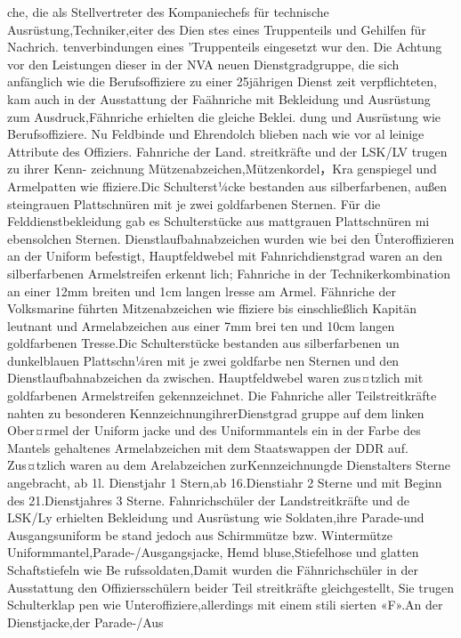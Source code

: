 che, die als Stellvertreter des Kompaniechefs für
technische Ausrüstung,Techniker,eiter des Dien
stes eines Truppenteils und Gehilfen für Nachrich.
tenverbindungen eines 'Truppenteils eingesetzt wur
den.
Die Achtung vor den Leistungen dieser in der
NVA neuen Dienstgradgruppe, die sich anfänglich
wie die Berufsoffiziere zu einer 25jährigen Dienst
zeit verpflichteten, kam auch in der Ausstattung der
Faähnriche mit Bekleidung und Ausrüstung zum
Ausdruck,Fähnriche erhielten die gleiche Beklei.
dung und Ausrüstung wie Berufsoffiziere. Nu
Feldbinde und Ehrendolch blieben nach wie vor al
leinige Attribute des Offiziers. Fahnriche der Land.
streitkräfte und der LSK/LV trugen zu ihrer Kenn-
zeichnung
Mützenabzeichen,Mützenkordel，Kra
genspiegel und Armelpatten wie ffiziere.Dic
Schulterst¼cke bestanden aus silberfarbenen, außen
steingrauen Plattschnüren mit je zwei goldfarbenen
Sternen. Für die Felddienstbekleidung gab es
Schulterstücke aus mattgrauen Plattschnüren mi
ebensolchen Sternen.
Dienstlaufbahnabzeichen
wurden wie bei den Ünteroffizieren an der Uniform
befestigt, Hauptfeldwebel mit Fahnrichdienstgrad
waren an den silberfarbenen Armelstreifen erkennt
lich; Fahnriche in der Technikerkombination an
einer 12mm breiten und 1cm langen lresse am
Armel.
Fähnriche der Volksmarine führten Mitzenabzeichen wie ffiziere bis einschließlich Kapitän
leutnant und Armelabzeichen aus einer 7mm brei
ten und 10cm langen goldfarbenen Tresse.Dic
Schulterstücke bestanden aus silberfarbenen un
dunkelblauen Plattschn¼ren mit je zwei goldfarbe
nen Sternen und den Dienstlaufbahnabzeichen da
zwischen. Hauptfeldwebel waren zus¤tzlich mit
goldfarbenen Armelstreifen gekennzeichnet.
Die Fahnriche aller Teilstreitkräfte nahten zu
besonderen KennzeichnungihrerDienstgrad
gruppe auf dem linken Ober¤rmel der Uniform
jacke und des Uniformmantels ein in der Farbe des
Mantels gehaltenes Armelabzeichen mit dem
Staatswappen der DDR auf. Zus¤tzlich waren au
dem Arelabzeichen zurKennzeichnungde
Dienstalters Sterne angebracht, ab 1l. Dienstjahr
1 Stern,ab 16.Dienstiahr 2 Sterne und mit Beginn
des 21.Dienstjahres 3 Sterne.
Fahnrichschüler der Landstreitkräfte und de
LSK/Ly erhielten Bekleidung und Ausrüstung wie
Soldaten,ihre Parade-und Ausgangsuniform be
stand jedoch aus Schirmmütze bzw. Wintermütze
Uniformmantel,Parade-/Ausgangsjacke, Hemd
bluse,Stiefelhose und glatten Schaftstiefeln wie Be
rufssoldaten,Damit wurden die Fähnrichschüler in
der Ausstattung den Offiziersschülern beider Teil
streitkräfte gleichgestellt, Sie trugen Schulterklap
pen wie Unteroffiziere,allerdings mit einem stili
sierten «F».An der Dienstjacke,der Parade-/Aus
